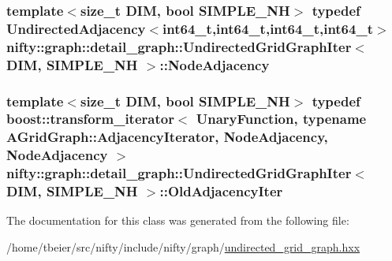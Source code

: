\subsubsection[{Node\+Adjacency}]{\setlength{\rightskip}{0pt plus 5cm}template$<$size\+\_\+t D\+I\+M, bool S\+I\+M\+P\+L\+E\+\_\+\+N\+H$>$ typedef Undirected\+Adjacency$<$int64\+\_\+t,int64\+\_\+t,int64\+\_\+t,int64\+\_\+t$>$ {\bf nifty\+::graph\+::detail\+\_\+graph\+::\+Undirected\+Grid\+Graph\+Iter}$<$ D\+I\+M, S\+I\+M\+P\+L\+E\+\_\+\+N\+H $>$\+::{\bf Node\+Adjacency}}\label{classnifty_1_1graph_1_1detail__graph_1_1UndirectedGridGraphIter_ab102d464df39aae71f7482baa37d8966}
\hypertarget{classnifty_1_1graph_1_1detail__graph_1_1UndirectedGridGraphIter_a0b2569d896d215175b54ed1f439ad5a5}{}
\subsubsection[{Old\+Adjacency\+Iter}]{\setlength{\rightskip}{0pt plus 5cm}template$<$size\+\_\+t D\+I\+M, bool S\+I\+M\+P\+L\+E\+\_\+\+N\+H$>$ typedef boost\+::transform\+\_\+iterator$<$ {\bf Unary\+Function}, typename A\+Grid\+Graph\+::\+Adjacency\+Iterator, {\bf Node\+Adjacency}, {\bf Node\+Adjacency} $>$ {\bf nifty\+::graph\+::detail\+\_\+graph\+::\+Undirected\+Grid\+Graph\+Iter}$<$ D\+I\+M, S\+I\+M\+P\+L\+E\+\_\+\+N\+H $>$\+::{\bf Old\+Adjacency\+Iter}}\label{classnifty_1_1graph_1_1detail__graph_1_1UndirectedGridGraphIter_a0b2569d896d215175b54ed1f439ad5a5}


The documentation for this class was generated from the following file\+:\begin{DoxyCompactItemize}
\item 
/home/tbeier/src/nifty/include/nifty/graph/\hyperlink{graph_2undirected__grid__graph_8hxx}{undirected\+\_\+grid\+\_\+graph.\+hxx}\end{DoxyCompactItemize}
